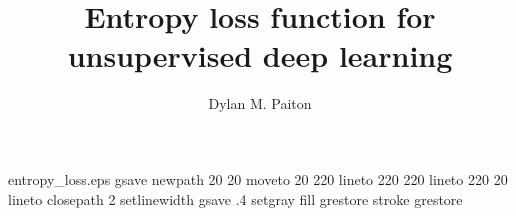 %
%
%

\begin{filecontents*}{entropy_loss.eps}
gsave
newpath
  20 20 moveto
  20 220 lineto
  220 220 lineto
  220 20 lineto
closepath
2 setlinewidth
gsave
  .4 setgray fill
grestore
stroke
grestore
\end{filecontents*}

\RequirePackage{fix-cm}

\documentclass[smallextended]{svjour3}       %

\smartqed  %

\usepackage{graphicx}
\usepackage{amsmath}

\newcommand{\argmin}{\operatornamewithlimits{argmin}}
\newcommand{\tightoverset}[2]{\mathop{#2}\limits^{\vbox to -.6ex{\kern-0.75ex\hbox{$#1$}\vss}}}



\title{Entropy loss function for unsupervised deep learning
}



\author{Dylan M. Paiton}  



\maketitle

